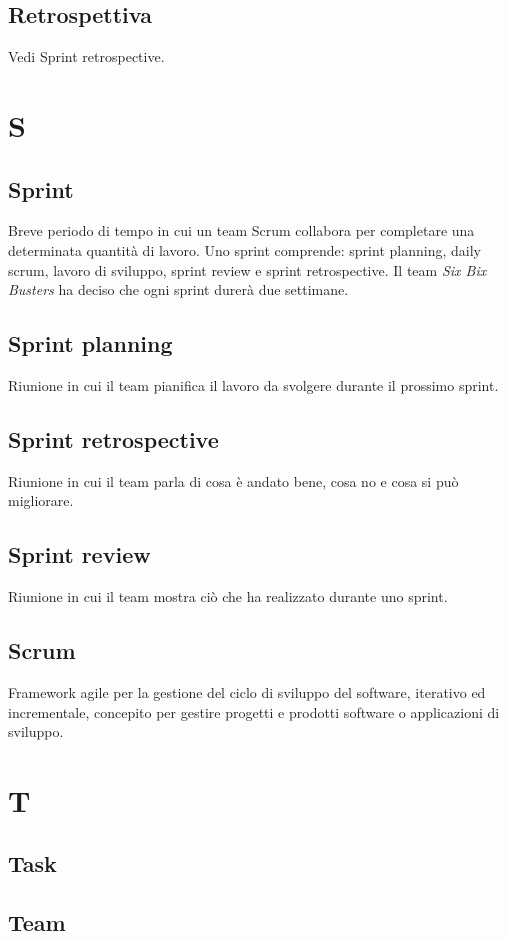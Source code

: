     \subsection{Retrospettiva}
    Vedi Sprint retrospective.
\section{S}
    \subsection{Sprint}
    Breve periodo di tempo in cui un team Scrum collabora per completare 
    una determinata quantità di lavoro. Uno sprint comprende:  
    sprint planning, daily scrum, lavoro di sviluppo, 
    sprint review e sprint retrospective. Il team \textit{Six Bix Busters} ha 
    deciso che ogni sprint durerà due settimane.   
    \subsection{Sprint planning}
    Riunione in cui il team pianifica il lavoro da svolgere durante il prossimo sprint. 
    \subsection{Sprint retrospective}
    Riunione in cui il team parla di cosa è andato bene, cosa no e cosa si può migliorare.
    \subsection{Sprint review} 
    Riunione in cui il team mostra ciò che ha realizzato durante uno sprint.
    \subsection{Scrum}
    Framework agile per la gestione del ciclo di sviluppo del software, 
    iterativo ed incrementale, concepito per gestire progetti e prodotti software 
    o applicazioni di sviluppo.

\section{T}
    \subsection{Task}
    \subsection{Team}
